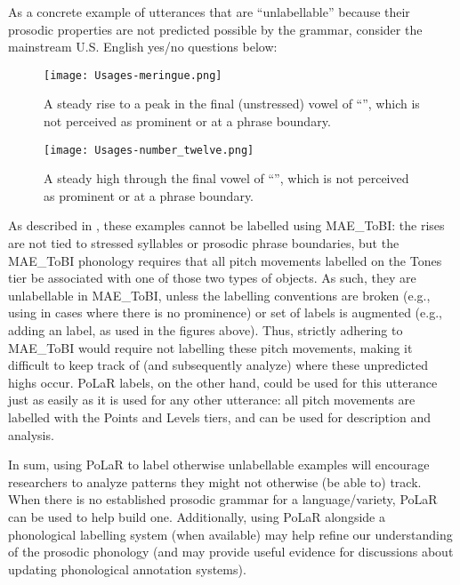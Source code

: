 As a concrete example of utterances that are “unlabellable” because their prosodic properties are not predicted possible by the grammar, consider the mainstream U.S. English yes/no questions below:

\begin{figure}[H]
\centering
%
\texttt{[image: Usages-meringue.png]}
%
\caption{A steady rise to a peak in the final (unstressed) vowel of “”, which is not perceived as prominent or at a phrase boundary.%
\label{fig:Usages meringue}%
}
\end{figure}

\begin{figure}[H]
\centering
%
\texttt{[image: Usages-number\_twelve.png]}
%
\caption{A steady high through the final vowel of “”, which is not perceived as prominent or at a phrase boundary.%
\label{fig:Usages number twelve}%
}
\end{figure}


As described in \citealt{ahnzhou19}, these examples cannot be labelled using MAE\_ToBI: the rises are not tied to stressed syllables or prosodic phrase boundaries, but the MAE\_ToBI phonology requires that all pitch movements labelled on the Tones tier be associated with one of those two types of objects. As such, they are unlabellable in MAE\_ToBI, unless the labelling conventions are broken (e.g., using  in cases where there is no prominence) or set of labels is augmented (e.g., adding an  label, as used in the figures above). Thus, strictly adhering to MAE\_ToBI would require not labelling these pitch movements, making it difficult to keep track of (and subsequently analyze) where these unpredicted highs occur. PoLaR labels, on the other hand, could be used for this utterance just as easily as it is used for any other utterance: all pitch movements are labelled with the Points and Levels tiers, and can be used for description and analysis.

In sum, using PoLaR to label otherwise unlabellable examples will encourage researchers to analyze patterns they might not otherwise (be able to) track. When there is no established prosodic grammar for a language\slash variety, PoLaR can be used to help build one. Additionally, using PoLaR alongside a phonological labelling system (when available) may help refine our understanding of the prosodic phonology (and may provide useful evidence for discussions about updating phonological annotation systems).


